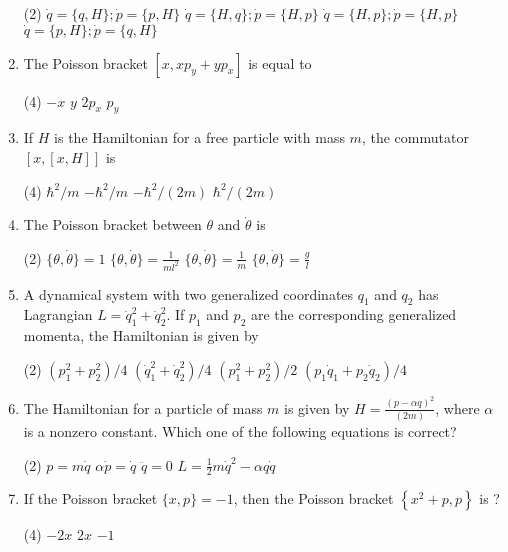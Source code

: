 \begin{enumerate}
{}
	 \begin{tasks}(2)
		\task[\textbf{a.}]$\dot{q}=\{q, H\} ; \dot{p}=\{p, H\}$
		\task[\textbf{b.}]$\dot{q}=\{H, q\} ; \dot{p}=\{H, p\}$
		\task[\textbf{c.}]$\dot{q}=\{H, p\} ; \dot{p}=\{H, p\}$
		\task[\textbf{d.}] $\dot{q}=\{p, H\} ; \dot{p}=\{q, H\}$
	\end{tasks}
	\item  The Poisson bracket $\left[x, x p_{y}+y p_{x}\right]$ is equal to
{}
	 \begin{tasks}(4)
		\task[\textbf{a.}] $-x$
		\task[\textbf{b.}]$y$
		\task[\textbf{c.}]$2 p_{x}$
		\task[\textbf{d.}] $p_{y}$
	\end{tasks}
	\item  If $H$ is the Hamiltonian for a free particle with mass $m$, the commutator $[x,[x, H]]$ is
	{}
	 \begin{tasks}(4)
		\task[\textbf{a.}]$\hbar^{2} / m$
		\task[\textbf{b.}]$-\hbar^{2} / m$
		\task[\textbf{c.}]$-\hbar^{2} /(2 m)$
		\task[\textbf{d.}] $\hbar^{2} /(2 m)$
	\end{tasks}
	\item  The Poisson bracket between $\theta$ and $\dot{\theta}$ is
{}
	 \begin{tasks}(2)
		\task[\textbf{a.}]$\{\theta, \dot{\theta}\}=1$
		\task[\textbf{b.}] $\{\theta, \dot{\theta}\}=\frac{1}{m l^{2}}$
		\task[\textbf{c.}]$\{\theta, \dot{\theta}\}=\frac{1}{m}$
		\task[\textbf{d.}] $\{\theta, \dot{\theta}\}=\frac{g}{l}$
	\end{tasks}
	\item  A dynamical system with two generalized coordinates $q_{1}$ and $q_{2}$ has Lagrangian $L=\dot{q}_{1}^{2}+\dot{q}_{2}^{2}$. If $p_{1}$ and $p_{2}$ are the corresponding generalized momenta, the Hamiltonian is given by
	{}
	 \begin{tasks}(2)
		\task[\textbf{a.}]$\left(p_{1}^{2}+p_{2}^{2}\right) / 4$
		\task[\textbf{b.}] $\left(\dot{q}_{1}^{2}+\dot{q}_{2}^{2}\right) / 4$
		\task[\textbf{c.}] $\left(p_{1}^{2}+p_{2}^{2}\right) / 2$
		\task[\textbf{d.}]  $\left(p_{1} \dot{q}_{1}+p_{2} \dot{q}_{2}\right) / 4$
	\end{tasks}
\item  The Hamiltonian for a particle of mass $m$ is given by $H=\frac{(p-\alpha q)^{2}}{(2 m)}$, where $\alpha$ is a nonzero constant. Which one of the following equations is correct?
{}
 \begin{tasks}(2)
	\task[\textbf{a.}]$p=m \dot{q}$
	\task[\textbf{b.}]$\alpha \dot{p}=\dot{q}$
	\task[\textbf{c.}] $\ddot{q}=0$
	\task[\textbf{d.}] $L=\frac{1}{2} m \dot{q}^{2}-\alpha q \dot{q}$
\end{tasks}
\item  If the Poisson bracket $\{x, p\}=-1$, then the Poisson bracket $\left\{x^{2}+p, p\right\}$ is ?
{}
 \begin{tasks}(4)
	\task[\textbf{a.}] $-2 x$
	\task[\textbf{b.}]$2 x$
	\task[\textbf{d.}] $-1$
\end{tasks}
\end{enumerate}
